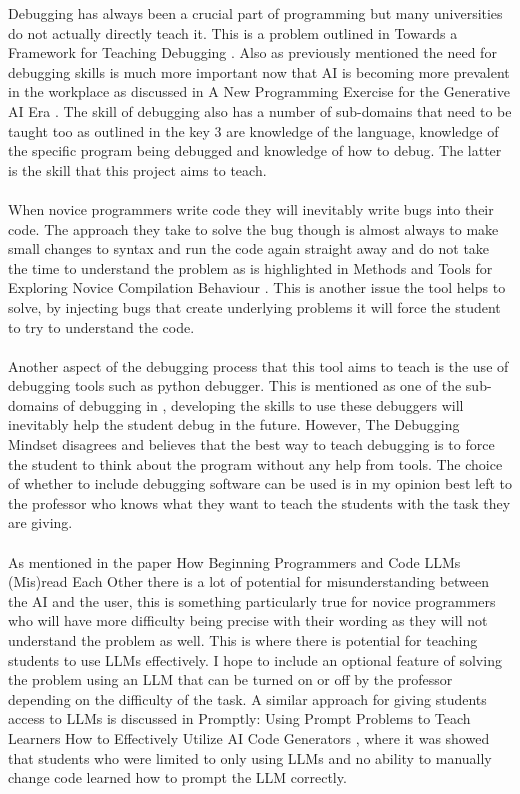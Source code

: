 \documentclass[12pt]{extarticle}
\begin{document}
Debugging has always been a crucial part of programming but many universities do not actually directly teach it. This is a problem outlined in Towards a Framework for Teaching Debugging \cite{li2019}. Also as previously mentioned the need for debugging skills is much more important now that AI is becoming more prevalent in the workplace as discussed in A New Programming Exercise for the Generative AI Era \cite{denny2024}. The skill of debugging also has a number of sub-domains that need to be taught too as outlined in \cite{li2019} the key 3 are knowledge of the language, knowledge of the specific program being debugged and knowledge of how to debug. The latter is the skill that this project aims to teach.\\
\\
When novice programmers write code they will inevitably write bugs into their code. The approach they take to solve the bug though is almost always to make small changes to syntax and run the code again straight away and do not take the time to understand the problem as is highlighted in Methods and Tools for Exploring Novice Compilation Behaviour \cite{jadud2006}. This is another issue the tool helps to solve, by injecting bugs that create underlying problems it will force the student to try to understand the code.\\
\\
Another aspect of the debugging process that this tool aims to teach is the use of debugging tools such as python debugger. This is mentioned as one of the sub-domains of debugging in \cite{li2019}, developing the skills to use these debuggers will inevitably help the student debug in the future. However, The Debugging Mindset \cite{odell2017} disagrees and believes that the best way to teach debugging is to force the student to think about the program without any help from tools. The choice of whether to include debugging software can be used is in my opinion best left to the professor who knows what they want to teach the students with the task they are giving.\\
\\
As mentioned in the paper How Beginning Programmers and Code LLMs (Mis)read Each Other \cite{nguyen2024} there is a lot of potential for misunderstanding between the AI and the user, this is something particularly true for novice programmers who will have more difficulty being precise with their wording as they will not understand the problem as well. This is where there is potential for teaching students to use LLMs effectively. I hope to include an optional feature of solving the problem using an LLM that can be turned on or off by the professor depending on the difficulty of the task. A similar approach for giving students access to LLMs is discussed in Promptly: Using Prompt Problems to Teach Learners How to Effectively Utilize AI Code Generators \cite{denny2023}, where it was showed that students who were limited to only using LLMs and no ability to manually change code learned how to prompt the LLM correctly.\\
\end{document}
